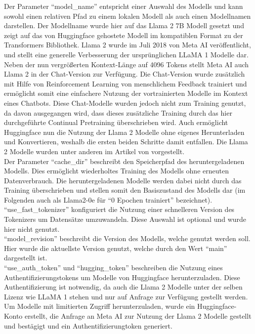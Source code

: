 Der Parameter \enquote{model\_name} entspricht einer Auswahl des Modells und kann sowohl einen relativen Pfad zu einem lokalen Modell als auch einen Modellnamen darstellen.
Der Modellname wurde hier auf das Llama 2 7B Modell gesetzt und zeigt auf das von Huggingface gehostete Modell im kompatiblen Format zu der Transformers Bibliothek.
Llama 2 wurde im Juli 2018 von Meta AI veröffentlicht, und stellt eine generelle Verbesserung der ursprünglichen LLaMA 1 Modelle dar.
Neben der nun vergrößerten Kontext-Länge auf 4096 Tokens stellt Meta AI auch Llama 2 in der Chat-Version zur Verfügung.
Die Chat-Version wurde zusätzlich mit Hilfe von Reinforcement Learning von menschlichem Feedback trainiert und ermöglicht somit eine einfachere Nutzung der vortrainierten Modelle im Kontext eines Chatbots.
Diese Chat-Modelle wurden jedoch nicht zum Training genutzt, da davon ausgegangen wird, dass dieses zusätzliche Training durch das hier durchgeführte Continual Pretraining überschrieben wird.
Auch ermöglicht Huggingface nun die Nutzung der Llama 2 Modelle ohne eigenes Herunterladen und Konvertieren, weshalb die ersten beiden Schritte damit entfallen.
Die Llama 2 Modelle wurden unter anderen im Artikel von \citet{llama2} vorgestellt.\\

Der Parameter \enquote{cache\_dir} beschreibt den Speicherpfad des heruntergeladenen Modells.
Dies ermöglicht wiederholtes Training des Modells ohne erneuten Datenverbrauch.
Die heruntergeladenen Modelle werden dabei nicht durch das Training überschrieben und stellen somit den Basiszustand des Modells dar (im Folgenden auch als Llama2-0e für \enquote{0 Epochen trainiert} bezeichnet).\\

\enquote{use\_fast\_tokenizer} konfiguriert die Nutzung einer schnelleren Version des Tokenizers um Datensätze umzuwandeln.
Diese Auswahl ist optional und wurde hier nicht genutzt.\\

\enquote{model\_revision} beschreibt die Version des Modells, welche genutzt werden soll.
Hier wurde die aktuellste Version genutzt, welche durch den Wert \enquote{main} dargestellt ist.\\

\enquote{use\_auth\_token} und \enquote{hugging\_token} beschreiben die Nutzung eines Authentifizierungstokens um Modelle von Huggingface herunterzuladen.
Diese Authentifizierung ist notwendig, da auch die Llama 2 Modelle unter der selben Lizenz wie LLaMA 1 stehen und nur auf Anfrage zur Verfügung gestellt werden.
Um Modelle mit limitierten Zugriff herunterzuladen, wurde ein Huggingface-Konto erstellt, die Anfrage an Meta AI zur Nutzung der Llama 2 Modelle gestellt und bestägigt und ein Authentifizierungtoken generiert.\\

